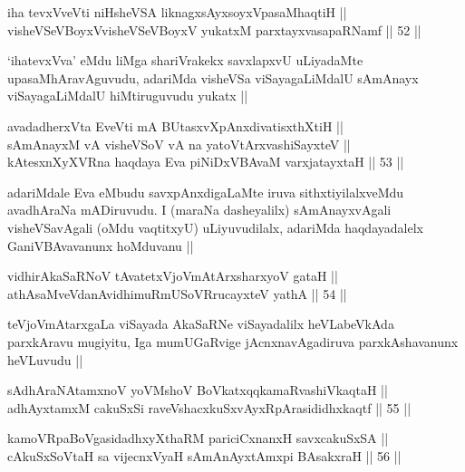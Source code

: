 \begin{shl}
iha tevxVveVti niHsheVSA liknagxsAyxsoyxVpasaMhaqtiH || \\
visheVSeVBoyxV\s visheVSeVBoyxV yukatxM parxtayxvasapaRNamf ||  52 ||  
\end{shl}

\begin{artha}
`ihatevxVva' eMdu liMga shariVrakekx savxlapxvU uLiyadaMte
  upasaMhAravAguvudu, adariMda visheVSa viSayagaLiMdalU sAmAnayx
  viSayagaLiMdalU hiMtiruguvudu yukatx ||
\end{artha}


\begin{shl}
avadadherxV\s ta EveVti mA BUtasxvXpAnxdivatisxthXtiH || \\
sAmAnayxM vA visheVSoV vA na yatoV\s tArxvashiSayxteV || \\
kAtesxnXyXVRna haqdaya Eva piNiDxVBAvaM varxjatayxtaH ||  53 ||  
\end{shl}

\begin{artha}
adariMdale Eva eMbudu savxpAnxdigaLaMte iruva sithxtiyilalxveMdu
avadhAraNa mADiruvudu. I (maraNa dasheyalilx) sAmAnayxvAgali
visheVSavAgali (oMdu vaqtitxyU) uLiyuvudilalx, adariMda haqdayadalelx
GaniVBAvavanunx hoMduvanu ||
\end{artha}


\begin{shl}
vidhirAkaSaRNoV tAvatetxVjoVmAtArxsharxyoV gataH || \\
athAsaMveVdanAvidhimuRmUSoVRrucayxteV yathA ||  54 ||  
\end{shl}

\begin{artha}
teVjoVmAtarxgaLa viSayada AkaSaRNe viSayadalilx heVLabeVkAda
parxkAravu mugiyitu, Iga mumUGaRvige jAcnxnavAgadiruva parxkAshavanunx
heVLuvudu ||
\end{artha}


\begin{shl}
sAdhAraNAtamxnoV yoVM\s shoV BoVkatxqqkamaRvashiVkaqtaH || \\
adhAyxtamxM cakuSxSi raveVshacxkuSxvAyxRpArasididhxkaqtf ||  55 ||  
\end{shl}
				
\begin{shl}
kamoVRpaBoVgasidadhxyXthaRM pariciCxnanxH savxcakuSxSA || \\
cAkuSxSoV\s taH sa vijecnxVyaH sAmAnAyxtAmx\s pi BAsakxraH ||  56 ||  
\end{shl}

